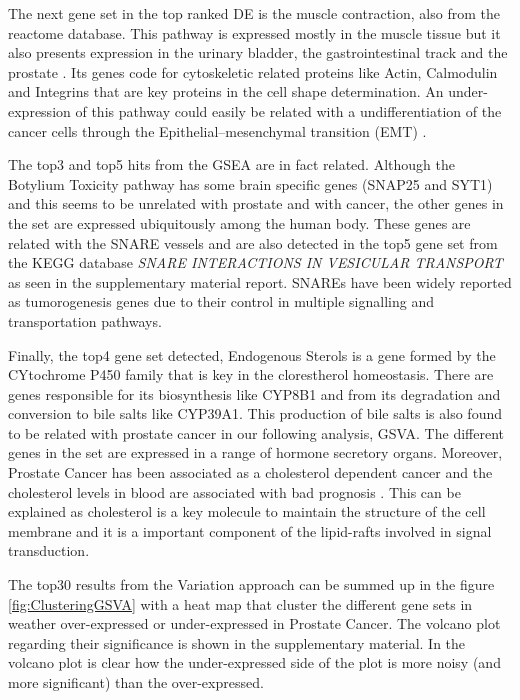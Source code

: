 \documentclass[9pt,twocolumn,twoside]{gsajnl}
\begin{document}
The next gene set in the top ranked DE is the muscle contraction, also from the reactome database. This pathway is expressed mostly in the muscle tissue but it also presents expression in the urinary bladder, the gastrointestinal track and the prostate \cite{proteinatlas,uhlen2015tissue}. Its genes code for cytoskeletic related proteins like Actin, Calmodulin and Integrins that are key proteins in the cell shape determination. An under-expression of this pathway could easily be related with a undifferentiation of the cancer cells through the Epithelial–mesenchymal transition (EMT) \citep{yilmaz2009emt}.

The top3 and top5 hits from the GSEA are in fact related. Although the Botylium Toxicity pathway has some brain specific genes (SNAP25 and SYT1) and this seems to be unrelated with prostate and with cancer, the other genes in the set are expressed ubiquitously among the human body. These genes are related with the SNARE vessels and are also detected in the top5 gene set from the KEGG database \textit{SNARE INTERACTIONS IN VESICULAR TRANSPORT} as seen in the supplementary material report. SNAREs have been widely reported as tumorogenesis genes due to their control in multiple signalling and transportation pathways.

Finally, the top4 gene set detected, Endogenous Sterols is a gene formed by the CYtochrome P450 family that is key in the clorestherol homeostasis. There are genes responsible for its biosynthesis like CYP8B1 and from its degradation and conversion to bile salts like CYP39A1. This production of bile salts is also found to be related with prostate cancer in our following analysis, GSVA. The different genes in the set are expressed in a range of hormone secretory organs. Moreover, Prostate Cancer has been associated as a cholesterol dependent cancer and the cholesterol levels in blood are associated with bad prognosis \cite{krycer2013cholesterol}. This can be explained as cholesterol is a key molecule to  maintain the structure of the cell membrane and it is a important component of the lipid-rafts involved in signal transduction.


The top30 results from the Variation approach can be summed up in the figure \ref{fig:ClusteringGSVA} with a heat map that cluster the different gene sets in weather over-expressed or under-expressed in Prostate Cancer. The volcano plot regarding their significance is shown in the supplementary material. In the volcano plot is clear how the under-expressed side of the plot is more noisy (and more significant) than the over-expressed.
\end{document}
